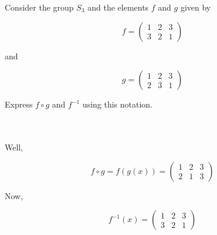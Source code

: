 Consider the group $S_3$ and the elements $f$ and $g$ given by

$$f=\left(\begin{array}{ccc} 1 & 2 & 3\\ 3 & 2 & 1\end{array}\right)$$

and

$$g=\left(\begin{array}{ccc} 1 & 2 & 3\\ 2 & 3 & 1\end{array}\right)$$

Express $f\circ g$ and $f^{-1}$ using this notation.\\\\

\begin{solution}\renewcommand{\qedsymbol}{}\ \\
    Well,
    
    $$f\circ g=f(g(x))=\left(\begin{array}{ccc} 1 & 2 & 3\\ 2 & 1 & 3\end{array}\right)$$
    
    Now,
    
    $$f^{-1}(x)=\left(\begin{array}{ccc} 1 & 2 & 3\\ 3 & 2 & 1\end{array}\right)$$

\end{solution}